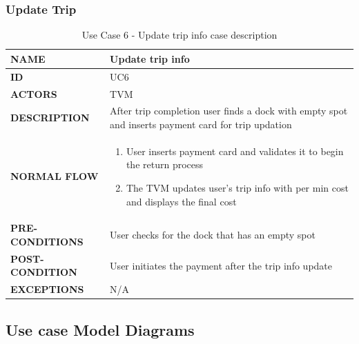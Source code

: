 \subsubsection{Update Trip}
\begin{table}[H]
\begin{center}
\renewcommand{\arraystretch}{2}
\begin{tabular}{|p{8cm}|p{8cm}| } 
 \hline
 \textbf{NAME} & Update trip info\\ 
 \hline
 \textbf{ID} & UC6\\ 
 \hline
 \textbf{ACTORS} & TVM\\
 \hline
 \textbf{DESCRIPTION} & After trip completion user finds a dock with empty spot and inserts payment card for trip updation \\  
 \hline
 \textbf{NORMAL FLOW} & \begin{enumerate}
     \item User inserts payment card and validates it to begin the return process
     \item The TVM updates user's trip info with per min cost and displays the final cost
 \end{enumerate} \\
 \hline
 \textbf{PRE-CONDITIONS} & User checks for the dock that has an empty spot\\
 \hline
 \textbf{POST-CONDITION} & User initiates the payment after the trip info update\\
 \hline
 \textbf{EXCEPTIONS} & N/A\\
 \hline
\end{tabular}
\caption{\label{demo-table}Use Case 6 - Update trip info case description}
\end{center}
\end{table}

\subsection{Use case Model Diagrams}
